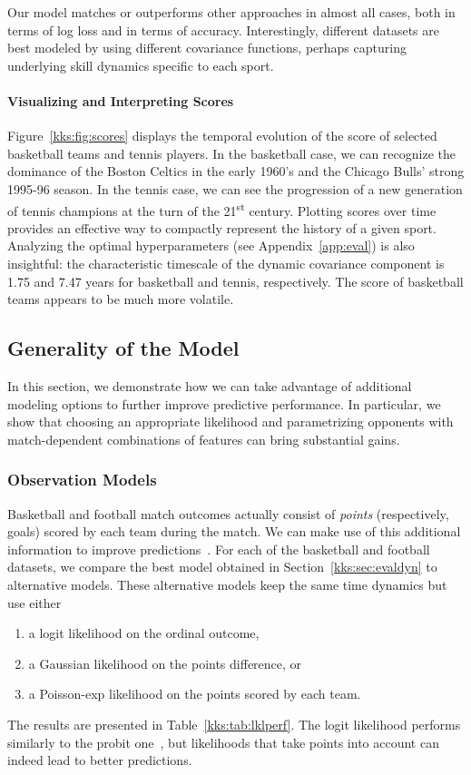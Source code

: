 Our model matches or outperforms other approaches in almost all cases, both in terms of log loss and in terms of accuracy.
Interestingly, different datasets are best modeled by using different covariance functions, perhaps capturing underlying skill dynamics specific to each sport.

\paragraph{Visualizing and Interpreting Scores}
Figure~\ref{kks:fig:scores} displays the temporal evolution of the score of selected basketball teams and tennis players.
In the basketball case, we can recognize the dominance of the Boston Celtics in the early 1960's and the Chicago Bulls' strong 1995-96 season.
In the tennis case, we can see the progression of a new generation of tennis champions at the turn of the 21\textsuperscript{st} century.
Plotting scores over time provides an effective way to compactly represent the history of a given sport.
Analyzing the optimal hyperparameters (see Appendix~\ref{app:eval}) is also insightful: the characteristic timescale of the dynamic covariance component is \num{1.75} and \num{7.47} years for basketball and tennis, respectively.
The score of basketball teams appears to be much more volatile.


\subsection{Generality of the Model}
\label{kks:sec:evalgen}

In this section, we demonstrate how we can take advantage of additional modeling options to further improve predictive performance.
In particular, we show that
choosing an appropriate likelihood and
parametrizing opponents with match-dependent combinations of features
can bring substantial gains.


\subsubsection{Observation Models}
Basketball and football match outcomes actually consist of \emph{points} (respectively, goals) scored by each team during the match.
We can make use of this additional information to improve predictions~\citep{maher1982modelling}.
For each of the basketball and football datasets, we compare the best model obtained in Section~\ref{kks:sec:evaldyn} to alternative models.
These alternative models keep the same time dynamics but use either
\begin{enumerate}
	\item a logit likelihood on the ordinal outcome,
	\item a Gaussian likelihood on the points difference, or
	\item a Poisson-exp likelihood on the points scored by each team.
\end{enumerate}
The results are presented in Table~\ref{kks:tab:lklperf}.
The logit likelihood performs similarly to the probit one~\citep{stern1992all}, but likelihoods that take points into account can indeed lead to better predictions.

